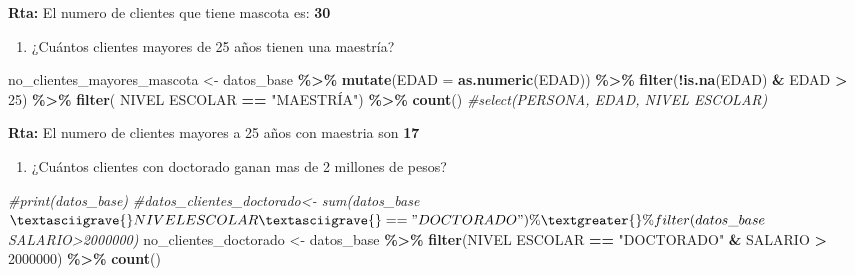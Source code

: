 \documentclass[
]{article}
\newenvironment{Shaded}{\begin{snugshade}}{\end{snugshade}}
\newcommand{\AttributeTok}[1]{\textcolor[rgb]{0.13,0.29,0.53}{#1}}
\newcommand{\CommentTok}[1]{\textcolor[rgb]{0.56,0.35,0.01}{\textit{#1}}}
\newcommand{\DecValTok}[1]{\textcolor[rgb]{0.00,0.00,0.81}{#1}}
\newcommand{\FunctionTok}[1]{\textcolor[rgb]{0.13,0.29,0.53}{\textbf{#1}}}
\newcommand{\NormalTok}[1]{#1}
\newcommand{\OtherTok}[1]{\textcolor[rgb]{0.56,0.35,0.01}{#1}}
\newcommand{\SpecialCharTok}[1]{\textcolor[rgb]{0.81,0.36,0.00}{\textbf{#1}}}
\newcommand{\StringTok}[1]{\textcolor[rgb]{0.31,0.60,0.02}{#1}}
\providecommand{\tightlist}{%
  \setlength{\itemsep}{0pt}\setlength{\parskip}{0pt}}
\begin{document}
\textbf{Rta: } El numero de clientes que tiene mascota es: \textbf{30}

\begin{enumerate}
\def\labelenumi{\alph{enumi}.}
\setcounter{enumi}{1}
\tightlist
\item
  ¿Cuántos clientes mayores de 25 años tienen una maestría?
\end{enumerate}

\begin{Shaded}
\begin{Highlighting}[]
\NormalTok{no\_clientes\_mayores\_mascota }\OtherTok{\textless{}{-}}\NormalTok{ datos\_base }\SpecialCharTok{\%\textgreater{}\%} 
  \FunctionTok{mutate}\NormalTok{(}\AttributeTok{EDAD =} \FunctionTok{as.numeric}\NormalTok{(EDAD)) }\SpecialCharTok{\%\textgreater{}\%} 
  \FunctionTok{filter}\NormalTok{(}\SpecialCharTok{!}\FunctionTok{is.na}\NormalTok{(EDAD) }\SpecialCharTok{\&}\NormalTok{ EDAD }\SpecialCharTok{\textgreater{}} \DecValTok{25}\NormalTok{) }\SpecialCharTok{\%\textgreater{}\%} 
  \FunctionTok{filter}\NormalTok{( }\StringTok{\textasciigrave{}}\AttributeTok{NIVEL ESCOLAR}\StringTok{\textasciigrave{}} \SpecialCharTok{==} \StringTok{"MAESTRÍA"}\NormalTok{) }\SpecialCharTok{\%\textgreater{}\%}
  \FunctionTok{count}\NormalTok{()}
    \CommentTok{\#select(PERSONA, EDAD, \textasciigrave{}NIVEL ESCOLAR\textasciigrave{})}
\end{Highlighting}
\end{Shaded}

\textbf{Rta: } El numero de clientes mayores a 25 años con maestria son
\textbf{17}

\begin{enumerate}
\def\labelenumi{\alph{enumi}.}
\setcounter{enumi}{2}
\tightlist
\item
  ¿Cuántos clientes con doctorado ganan mas de 2 millones de pesos?
\end{enumerate}

\begin{Shaded}
\begin{Highlighting}[]
\CommentTok{\#print(datos\_base)}
\CommentTok{\#datos\_clientes\_doctorado\textless{}{-} sum(datos\_base$\textasciigrave{}NIVEL ESCOLAR\textasciigrave{} == "DOCTORADO") \%\textgreater{}\% filter(datos\_base$SALARIO\textgreater{}2000000)}
\NormalTok{no\_clientes\_doctorado }\OtherTok{\textless{}{-}}\NormalTok{ datos\_base }\SpecialCharTok{\%\textgreater{}\%} \FunctionTok{filter}\NormalTok{(}\StringTok{\textasciigrave{}}\AttributeTok{NIVEL ESCOLAR}\StringTok{\textasciigrave{}} \SpecialCharTok{==} \StringTok{"DOCTORADO"} \SpecialCharTok{\&}\NormalTok{ SALARIO }\SpecialCharTok{\textgreater{}} \DecValTok{2000000}\NormalTok{) }\SpecialCharTok{\%\textgreater{}\%} \FunctionTok{count}\NormalTok{()}
\end{Highlighting}
\end{Shaded}
\end{document}
